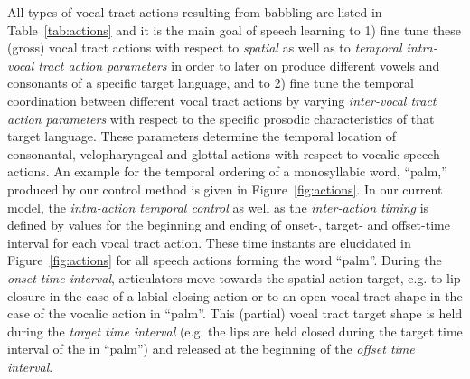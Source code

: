 \documentclass[conference]{IEEEtran}
\let\ipa\textipa
\begin{document}
All types of vocal tract actions resulting from babbling are listed in
Table~\ref{tab:actions} and it is the main goal of speech learning
to 1) fine tune these (gross) vocal tract actions with respect to
\textit{spatial} as well as to \textit{temporal intra-vocal tract
  action parameters} in order to later on produce
different vowels and consonants of a specific target language, and to
2) fine tune the temporal coordination between different vocal tract
actions by varying \textit{inter-vocal tract action parameters} with
respect to the specific prosodic characteristics of that target
language. These parameters determine the temporal location of
consonantal, velopharyngeal and glottal actions with respect to
vocalic speech actions. An example for the temporal ordering of a
monosyllabic word, ``palm,'' produced by our control method is given in
Figure~\ref{fig:actions}. In our current model, the
\textit{intra-action temporal control} as well as the
\textit{inter-action timing} is defined by values for the beginning
and ending of onset-, target- and offset-time interval for each vocal
tract action. These time instants are elucidated in
Figure~\ref{fig:actions} for all speech actions forming the word
``palm''. During the \textit{onset time interval}, articulators move
towards the spatial action target, e.g. to lip closure in the case of a
labial closing action or to an open vocal tract shape in the case of the
vocalic action in ``palm''. This (partial) vocal tract target shape is
held during the \textit{target time interval}
(e.g. the lips are held closed during
the target time interval of the \ipa{[p]} in ``palm'')
and released at the beginning of the \textit{offset time interval}.
\end{document}
